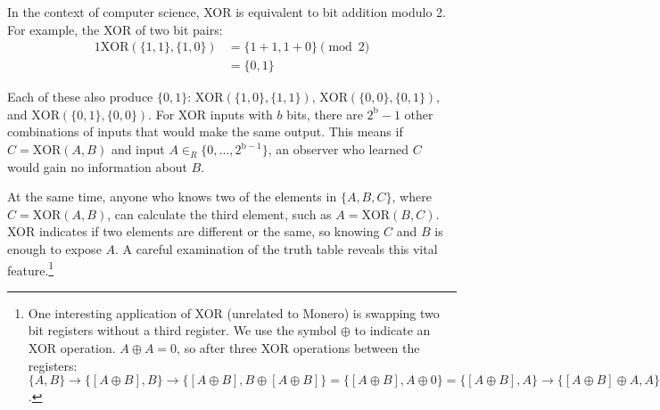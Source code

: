 In the context of computer science, XOR is equivalent to bit addition modulo 2. For example, the XOR of two bit pairs:
\begin{alignat*}{1}
    \text{XOR}(\{1,1\},\{1,0\}) &= \{1+1,1+0\} \pmod 2 \\
                                &= \{0,1\} 
\end{alignat*}

Each of these also produce $\{0,1\}$: $\text{XOR}(\{1,0\},\{1,1\})$, $\text{XOR}(\{0,0\},\{0,1\})$, and $\text{XOR}(\{0,1\},\{0,0\})$. For XOR inputs with $b$ bits, there are $2^{\text{b}} - 1$ other combinations of inputs that would make the same output. This means if $C = \text{XOR}(A,B)$ and input $A \in_R \{0,...,2^{\text{b}-1}\}$, an observer who learned $C$ would gain no information about $B$.

At the same time, anyone who knows two of the elements in $\{A,B,C\}$, where $C = \text{XOR}(A,B)$, can calculate the third element, such as $A = \text{XOR}(B,C)$. XOR indicates if two elements are different or the same, so knowing $C$ and $B$ is enough to expose $A$. A careful examination of the truth table reveals this vital feature.\footnote{One interesting application of XOR (unrelated to Monero) is swapping two bit registers without a third register. We use the symbol $\oplus$ to indicate an XOR operation. $A \oplus A = 0$, so after three XOR operations between the registers: $\{A, B\} \rightarrow{} \{[A \oplus B], B\} \rightarrow{} \{[A \oplus B], B \oplus [A \oplus B]\} = \{[A \oplus B], A \oplus 0\} = \{[A \oplus B], A\} \rightarrow{} \{[A \oplus B] \oplus A, A\} = \{B, A\}$.}